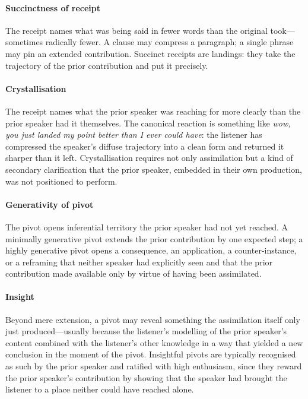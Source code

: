\paragraph{Succinctness of receipt} The receipt names what was being said in fewer words than the original took---sometimes radically fewer. A clause may compress a paragraph; a single phrase may pin an extended contribution. Succinct receipts are landings: they take the trajectory of the prior contribution and put it precisely.

\paragraph{Crystallisation} The receipt names what the prior speaker was reaching for more clearly than the prior speaker had it themselves. The canonical reaction is something like \emph{wow, you just landed my point better than I ever could have}: the listener has compressed the speaker's diffuse trajectory into a clean form and returned it sharper than it left. Crystallisation requires not only assimilation but a kind of secondary clarification that the prior speaker, embedded in their own production, was not positioned to perform.

\paragraph{Generativity of pivot} The pivot opens inferential territory the prior speaker had not yet reached. A minimally generative pivot extends the prior contribution by one expected step; a highly generative pivot opens a consequence, an application, a counter-instance, or a reframing that neither speaker had explicitly seen and that the prior contribution made available only by virtue of having been assimilated.

\paragraph{Insight} Beyond mere extension, a pivot may reveal something the assimilation itself only just produced---usually because the listener's modelling of the prior speaker's content combined with the listener's other knowledge in a way that yielded a new conclusion in the moment of the pivot. Insightful pivots are typically recognised as such by the prior speaker and ratified with high enthusiasm, since they reward the prior speaker's contribution by showing that the speaker had brought the listener to a place neither could have reached alone.


